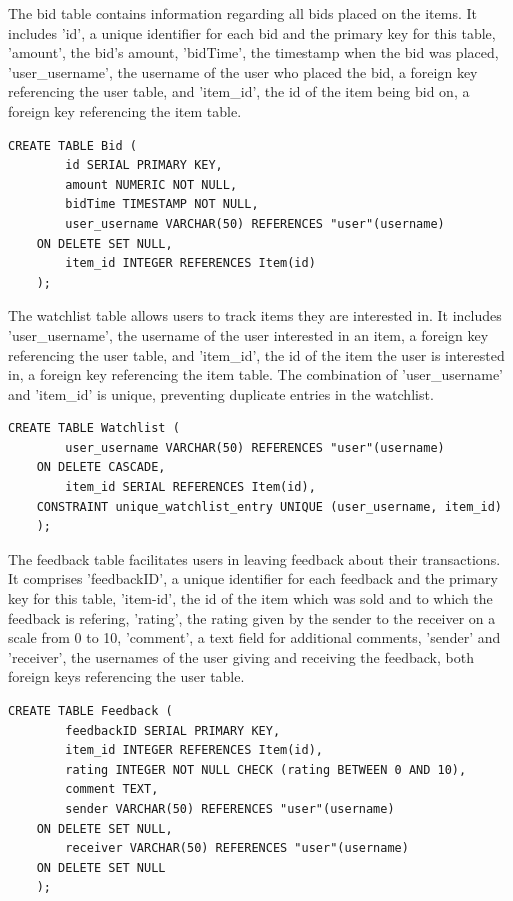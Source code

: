 The bid table contains information regarding all bids placed on the items. It includes 'id', a unique identifier for each bid and the primary key for this table, 'amount', the bid's amount, 'bidTime', the timestamp when the bid was placed, 'user\_username', the username of the user who placed the bid, a foreign key referencing the user table, and 'item\_id', the id of the item being bid on, a foreign key referencing the item table.
\clearpage

\vspace{0.2cm}
\begin{lstlisting}[style=sqlStyle]
	CREATE TABLE Bid (
		id SERIAL PRIMARY KEY,
		amount NUMERIC NOT NULL,
		bidTime TIMESTAMP NOT NULL,
		user_username VARCHAR(50) REFERENCES "user"(username)
	ON DELETE SET NULL,
		item_id INTEGER REFERENCES Item(id)
	);
\end{lstlisting}
\vspace{0.2cm}

The watchlist table allows users to track items they are interested in. It includes 'user\_username', the username of the user interested in an item, a foreign key referencing the user table, and 'item\_id', the id of the item the user is interested in, a foreign key referencing the item table. The combination of 'user\_username' and 'item\_id' is unique, preventing duplicate entries in the watchlist.

\vspace{0.2cm}
\begin{lstlisting}[style=sqlStyle]
	CREATE TABLE Watchlist (
		user_username VARCHAR(50) REFERENCES "user"(username)
	ON DELETE CASCADE,
		item_id SERIAL REFERENCES Item(id),
	CONSTRAINT unique_watchlist_entry UNIQUE (user_username, item_id)
	);
\end{lstlisting}
\vspace{0.2cm}

The feedback table facilitates users in leaving feedback about their transactions. It comprises 'feedbackID', a unique identifier for each feedback and the primary key for this table, 'item-id', the id of the item which was sold and to which the feedback is refering, 'rating', the rating given by the sender to the receiver on a scale from 0 to 10, 'comment', a text field for additional comments, 'sender' and 'receiver', the usernames of the user giving and receiving the feedback, both foreign keys referencing the user table.
\clearpage

\vspace{0.2cm}
\begin{lstlisting}[style=sqlStyle]
	CREATE TABLE Feedback (
		feedbackID SERIAL PRIMARY KEY,
		item_id INTEGER REFERENCES Item(id),
		rating INTEGER NOT NULL CHECK (rating BETWEEN 0 AND 10),
		comment TEXT,
		sender VARCHAR(50) REFERENCES "user"(username)
	ON DELETE SET NULL,
		receiver VARCHAR(50) REFERENCES "user"(username)
	ON DELETE SET NULL
	);
\end{lstlisting}
\vspace{0.2cm}

